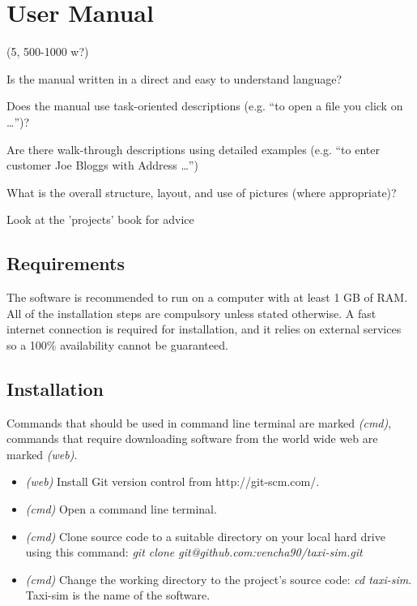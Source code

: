 \newpage
\section{User Manual}
\label{sec:user_manual}


(5, 500-1000 w?)

Is the manual written in a direct and easy to understand language?

Does the manual use task-oriented descriptions (e.g. “to open a file you click
on …”)?

Are there walk-through descriptions using detailed examples (e.g. “to enter
customer Joe Bloggs with Address …”)

What is the overall structure, layout, and use of pictures (where appropriate)?

Look at the 'projects' book for advice

\subsection{Requirements}

The software is recommended to run on a computer with at least 1 GB of RAM. All
of the installation steps are compulsory unless stated otherwise. A fast
internet connection is required for installation, and it relies on external
services so a 100\% availability cannot be guaranteed.


\subsection{Installation}

Commands that should be used in command line terminal are marked
\textit{(cmd)}, commands that require downloading software from the world wide
web are marked \textit{(web)}.

\begin{itemize}
  \item \textit{(web)} Install Git \parencite{Git} version control from 
        http://git-scm.com/.
  \item \textit{(cmd)} Open a command line terminal.
  \item \textit{(cmd)} Clone source code to a suitable directory on your local
        hard drive using this command: 
        \textit{git clone git@github.com:vencha90/taxi-sim.git}
  \item \textit{(cmd)} Change the working directory to the project's source
        code: \textit{cd taxi-sim}. Taxi-sim is the name of the software.
\end{itemize}


